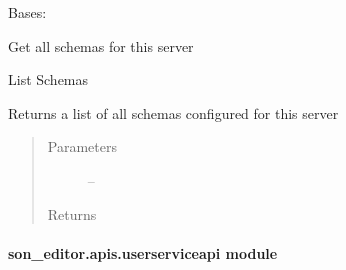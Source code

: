 \documentclass[letterpaper,10pt,english]{sphinxmanual}
\begin{document}
\begin{fulllineitems}
\label{_source/son_editor.apis:son_editor.apis.schemaapi.Schemas}
Bases: 

Get all schemas for this server

\begin{fulllineitems}
\label{_source/son_editor.apis:son_editor.apis.schemaapi.Schemas.get}
List Schemas

Returns a list of all schemas configured for this server
\begin{quote}\begin{description}
\item[{Parameters}] \leavevmode
{} -- 

\item[{Returns}] \leavevmode


\end{description}\end{quote}

\end{fulllineitems}


\begin{fulllineitems}
\label{_source/son_editor.apis:son_editor.apis.schemaapi.Schemas.methods}
\end{fulllineitems}


\end{fulllineitems}



\paragraph{son\_editor.apis.userserviceapi module}
\label{_source/son_editor.apis:son-editor-apis-userserviceapi-module}\label{_source/son_editor.apis:module-son_editor.apis.userserviceapi}
\end{document}
